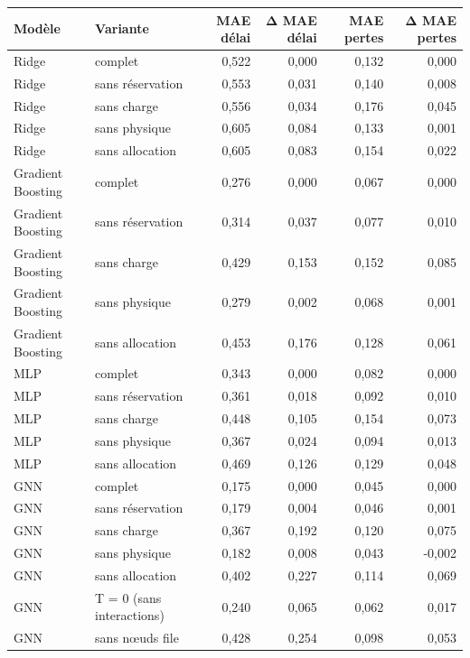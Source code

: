 \begin{tabular}{llrrrr}
\toprule
Modèle & Variante & MAE délai & Δ MAE délai & MAE pertes & Δ MAE pertes \\
\midrule
Ridge & complet & 0{,}522 & 0{,}000 & 0{,}132 & 0{,}000 \\
Ridge & sans réservation & 0{,}553 & 0{,}031 & 0{,}140 & 0{,}008 \\
Ridge & sans charge & 0{,}556 & 0{,}034 & 0{,}176 & 0{,}045 \\
Ridge & sans physique & 0{,}605 & 0{,}084 & 0{,}133 & 0{,}001 \\
Ridge & sans allocation & 0{,}605 & 0{,}083 & 0{,}154 & 0{,}022 \\
Gradient Boosting & complet & 0{,}276 & 0{,}000 & 0{,}067 & 0{,}000 \\
Gradient Boosting & sans réservation & 0{,}314 & 0{,}037 & 0{,}077 & 0{,}010 \\
Gradient Boosting & sans charge & 0{,}429 & 0{,}153 & 0{,}152 & 0{,}085 \\
Gradient Boosting & sans physique & 0{,}279 & 0{,}002 & 0{,}068 & 0{,}001 \\
Gradient Boosting & sans allocation & 0{,}453 & 0{,}176 & 0{,}128 & 0{,}061 \\
MLP & complet & 0{,}343 & 0{,}000 & 0{,}082 & 0{,}000 \\
MLP & sans réservation & 0{,}361 & 0{,}018 & 0{,}092 & 0{,}010 \\
MLP & sans charge & 0{,}448 & 0{,}105 & 0{,}154 & 0{,}073 \\
MLP & sans physique & 0{,}367 & 0{,}024 & 0{,}094 & 0{,}013 \\
MLP & sans allocation & 0{,}469 & 0{,}126 & 0{,}129 & 0{,}048 \\
GNN & complet & 0{,}175 & 0{,}000 & 0{,}045 & 0{,}000 \\
GNN & sans réservation & 0{,}179 & 0{,}004 & 0{,}046 & 0{,}001 \\
GNN & sans charge & 0{,}367 & 0{,}192 & 0{,}120 & 0{,}075 \\
GNN & sans physique & 0{,}182 & 0{,}008 & 0{,}043 & -0{,}002 \\
GNN & sans allocation & 0{,}402 & 0{,}227 & 0{,}114 & 0{,}069 \\
GNN & T = 0 (sans interactions) & 0{,}240 & 0{,}065 & 0{,}062 & 0{,}017 \\
GNN & sans nœuds file & 0{,}428 & 0{,}254 & 0{,}098 & 0{,}053 \\
\bottomrule
\end{tabular}
